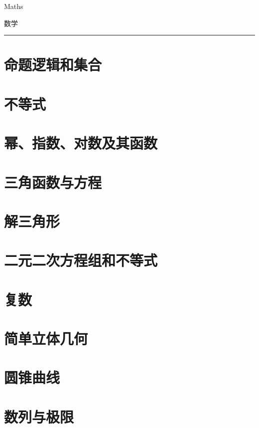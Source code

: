 \documentclass{ctexbook}
\begin{document}
{\Huge Maths \par \vspace{1.5em} 数学}

\rule{\textwidth}{1pt}

{\Huge{}}



{\tableofcontents}

\chapter{命题逻辑和集合}



\chapter{不等式}
\chapter{幂、指数、对数及其函数}
\chapter{三角函数与方程}
\chapter{解三角形}
\chapter{二元二次方程组和不等式}
\chapter{复数}
\chapter{简单立体几何}
\chapter{圆锥曲线}
\chapter{数列与极限}
\end{document}
